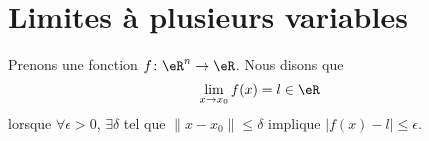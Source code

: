 


\section{Limites à plusieurs variables}
\label{SecLimVarsPlus}

Prenons une fonction \( f\colon \eR^n\to \eR\). Nous disons que
\begin{equation}
	\lim_{x\to x_0}f(x)=l\in\eR
\end{equation}
lorsque \( \forall \epsilon>0\), \( \exists\delta\) tel que \( \| x-x_0 \|\leq\delta\) implique \( | f(x)-l |\leq \epsilon\).

